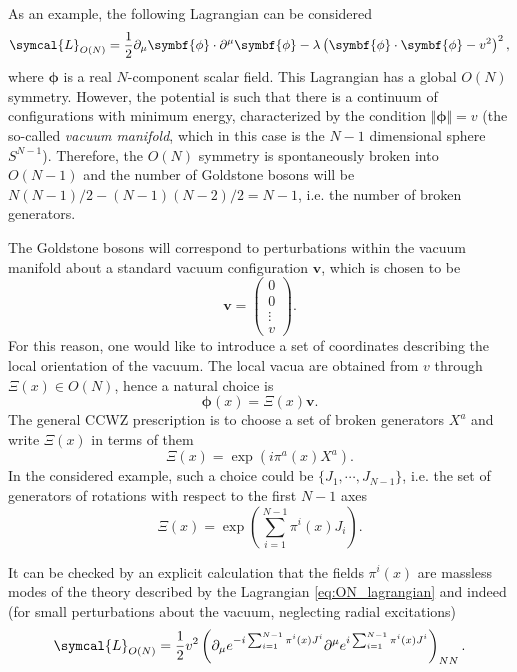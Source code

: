 As an example, the following Lagrangian can be considered
\begin{equation}
  \symcal{L}_{O(N)} = \frac{1}{2} \partial_\mu \symbf{\phi} \cdot \partial^\mu \symbf{\phi} - \lambda \left( \symbf{\phi} \cdot \symbf{\phi} - v^2 \right)^2 ,
  \label{eq:ON_lagrangian}
\end{equation}
where $\symbf{\phi}$ is a real $N$-component scalar field. This Lagrangian has a global $O(N)$ symmetry. However, the potential is such that there is a continuum of configurations with minimum energy, characterized by the condition $\Vert \symbf{\phi} \Vert = v$ (the so-called \emph{vacuum manifold}, which in this case is the $N-1$ dimensional sphere $S^{N-1}$). Therefore, the $O(N)$ symmetry is spontaneously broken into $O(N-1)$ and the number of Goldstone bosons will be $N(N-1)/2 - (N-1)(N-2)/2 = N-1$, i.e. the number of broken generators. 

The Goldstone bosons will correspond to perturbations within the vacuum manifold about a standard vacuum configuration $\symbf{v}$, which is chosen to be 
\begin{equation}
  \symbf{v} = \begin{pmatrix} 0 \\ 0 \\ \vdots \\ v \end{pmatrix} .
\end{equation}
For this reason, one would like to introduce a set of coordinates describing the local orientation of the vacuum. The local vacua are obtained from $v$ through $\Xi (x) \in O(N)$, hence a natural choice is 
\begin{equation}
  \symbf{\phi} (x) = \Xi (x) \symbf{v} .
  \label{eq:phi_from_xi}
\end{equation}
The general CCWZ prescription is to choose a set of broken generators $X^a$ and write $\Xi(x)$ in terms of them
\begin{equation}
  \Xi (x) = \exp{\left( i \pi^a(x) X^a \right)} .
\end{equation}
In the considered example, such a choice could be $ \{ J_1, \cdots, J_{N-1} \}$, i.e. the set of generators of rotations with respect to the first $N-1$ axes 
\begin{equation}
  \Xi (x) = \exp{\left( \sum_{i = 1}^{N-1} \pi^i(x) J_i \right)} .
  \label{eq:ON_xi}
\end{equation}

It can be checked by an explicit calculation that the fields $\pi^i(x)$ are massless modes of the theory described by the Lagrangian \eqref{eq:ON_lagrangian} and indeed (for small perturbations about the vacuum, neglecting radial excitations)
\begin{equation}
  \symcal{L}_{O(N)} = \frac{1}{2} v^2 \left( \partial_\mu e^{- i \sum_{i = 1}^{N-1} \pi^i(x) J^i} \partial^\mu e^{i \sum_{i = 1}^{N-1} \pi^i(x) J^i} \right)_{N N} .
  \label{eq:linear_sigma_kinetic_lagrangian}
\end{equation}

